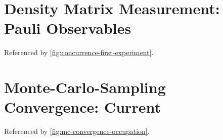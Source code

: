 \newpage
\begin{minipage}{\textwidth}
    \section{Density Matrix Measurement: Pauli Observables}
        \label{appendix:pauli-measurements}
        Referenced by \autoref{fig:concurrence-first-experiment}.\\
        \vbox{
        }
\end{minipage}

\newpage
\begin{minipage}{\textwidth}
    \section{Monte-Carlo-Sampling Convergence: Current}
        \label{appendix:mc-convergence-spin-current}
        Referenced by \autoref{fig:mc-convergence-occupation}.\\
        \vbox{
        }
\end{minipage}